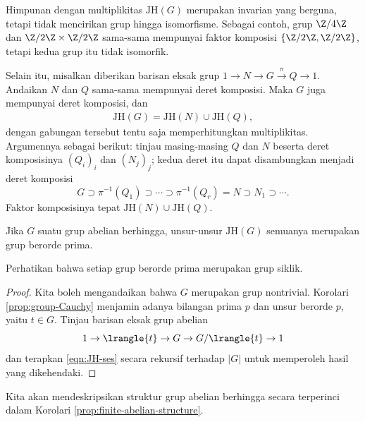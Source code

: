 Himpunan dengan multiplikitas $\text{JH}(G)$ merupakan invarian yang berguna, tetapi tidak mencirikan grup hingga isomorfisme. Sebagai contoh, grup $\Z/4\Z$ dan $\Z/2\Z \times \Z/2\Z$ sama-sama mempunyai faktor komposisi $\{ \Z/2\Z, \Z/2\Z\}$, tetapi kedua grup itu tidak isomorfik.

Selain itu, misalkan diberikan barisan eksak grup $1 \to N \to G \xrightarrow{\pi} Q \to 1$. Andaikan $N$ dan $Q$ sama-sama mempunyai deret komposisi. Maka $G$ juga mempunyai deret komposisi, dan
\begin{gather}\label{eqn:JH-ses}
	\text{JH}(G) = \text{JH}(N) \cup  \text{JH}(Q),
\end{gather}
dengan gabungan tersebut tentu saja memperhitungkan multiplikitas. Argumennya sebagai berikut: tinjau masing-masing $Q$ dan $N$ beserta deret komposisinya $(Q_i)_i$ dan $(N_j)_j$; kedua deret itu dapat disambungkan menjadi deret komposisi
\[ G \supset \pi^{-1}(Q_1) \supset \cdots \supset \pi^{-1}(Q_r) = N \supset N_1 \supset \cdots . \]
Faktor komposisinya tepat $\text{JH}(N) \cup  \text{JH}(Q)$.

\begin{proposition}\label{prop:abelian-composition-series}
	Jika $G$ suatu grup abelian berhingga, unsur-unsur $\text{JH}(G)$ semuanya merupakan grup berorde prima.
\end{proposition}
Perhatikan bahwa setiap grup berorde prima merupakan grup siklik.
\begin{proof}
	Kita boleh mengandaikan bahwa $G$ merupakan grup nontrivial. Korolari \ref{prop:group-Cauchy} menjamin adanya bilangan prima $p$ dan unsur berorde $p$, yaitu $t \in G$. Tinjau barisan eksak grup abelian
	\[ 1 \to \lrangle{t} \to G \to G/\lrangle{t} \to 1 \]
	dan terapkan \eqref{eqn:JH-ses} secara rekursif terhadap $|G|$ untuk memperoleh hasil yang dikehendaki.
\end{proof}

Kita akan mendeskripsikan struktur grup abelian berhingga secara terperinci dalam Korolari \ref{prop:finite-abelian-structure}.
